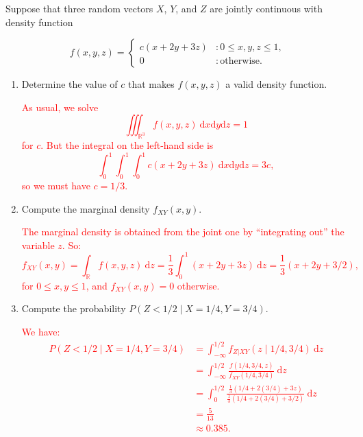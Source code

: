 \documentclass[12pt,reqno]{amsart}
\begin{document}
\prob Suppose that three random vectors $X$, $Y$, and $Z$ are jointly continuous with density function

	\[
	f(x,y,z) = \begin{cases}
	c(x+2y+3z) & : 0\leq x, y, z \leq 1, \\
	0 & : \text{otherwise}.
	\end{cases}
	\]

\medskip
\begin{enumerate}
\item Determine the value of $c$ that makes $f(x,y,z)$ a valid density function.

\bigskip
\textcolor{red}{As usual, we solve
	\[
	\iiint_{\mathbb{R}^3} f(x,y,z) \ \text{d}x\text{d}y\text{d}z = 1
	\]
for $c$. But the integral on the left-hand side is
	\[
	\int_0^1 \int_0^1 \int_0^1 c (x+2y+3z)\ \text{d}x\text{d}y\text{d}z = 3c,
	\]
so we must have $c = 1/3$.}
\bigskip

\item Compute the marginal density $f_{XY}(x,y)$.

\bigskip
\textcolor{red}{The marginal density is obtained from the joint one by ``integrating out'' the variable $z$. So:
	\[
	f_{XY}(x,y) = \int_{\mathbb{R}} f(x,y,z) \ \text{d} z = \frac{1}{3} \int_0^1(x+2y+3z) \ \text{d} z = \frac{1}{3}\left( x+2y + 3/2 \right),
	\]
for $0\leq x, y \leq 1$, and $f_{XY}(x,y)=0$ otherwise.}
\bigskip

\item Compute the probability $P\left( Z < 1/2 \mid X = 1/4,  Y = 3/4 \right)$.

\bigskip
\textcolor{red}{We have:
	\begin{align*}
	P\left( Z < 1/2 \mid X = 1/4,  Y = 3/4 \right) &= \int_{-\infty}^{1/2} f_{Z|XY}(z \mid 1/4,3/4) \ \text{d}z \\
	&= \int_{-\infty}^{1/2} \frac{f(1/4,3/4,z)}{f_{XY}(1/4,3/4)} \ \text{d} z \\
	&= \int_0^{1/2} \frac{\frac{1}{3} (1/4+2(3/4)+3z)}{\frac{1}{3}(1/4 + 2(3/4) + 3/2)} \ \text{d} z \\
	&= \frac{5}{13} \\
	&\approx 0.385.
	\end{align*}}
\bigskip
\end{enumerate}
\end{document}
